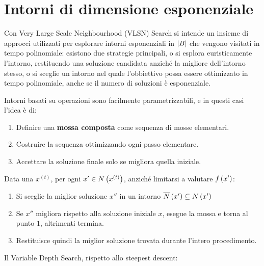 \documentclass[\main/main.tex]{subfiles}
\begin{document}
\chapter{Intorni di dimensione esponenziale}
\begin{multicols}{2}
\begin{definition}
    Con Very Large Scale Neighbourhood (VLSN) Search si intende un insieme di approcci utilizzati per esplorare intorni esponenziali in \(\left\lvert B\right\rvert\) che vengono visitati in tempo polinomiale: esistono due strategie principali, o si esplora euristicamente l'intorno, restituendo una soluzione candidata anziché la migliore dell'intorno stesso, o si sceglie un intorno nel quale l'obbiettivo possa essere ottimizzato in tempo polinomiale, anche se il numero di soluzioni è esponenziale.    
\end{definition}
\begin{definition}
    Intorni basati su operazioni sono facilmente parametrizzabili, e in questi casi l'idea è di:
    \begin{enumerate}
        \item Definire una \textbf{mossa composta} come sequenza di mosse elementari.
        \item Costruire la sequenza ottimizzando ogni passo elementare.
        \item Accettare la soluzione finale solo se migliora quella iniziale.
    \end{enumerate}
\end{definition}
\begin{definition}
Data una \(x^{(t)}\), per ogni \(x' \in N\left(x^{\left(t\right)}\right)\), anziché limitarsi a valutare \(f\left(x'\right)\):
\begin{enumerate}
    \item Si sceglie la miglior soluzione \(x''\) in un intorno \(\overline{N}\left(x'\right) \subseteq N\left(x'\right)\)
    \item Se \(x''\) migliora rispetto alla soluzione iniziale \(x\), esegue la mossa e torna al punto \(1\), altrimenti termina.
    \item Restituisce quindi la miglior soluzione trovata durante l'intero procedimento.
\end{enumerate}    
\end{definition}
\begin{observation}
    Il Variable Depth Search, rispetto allo steepest descent:

\end{observation}
\end{multicols}
\end{document}
